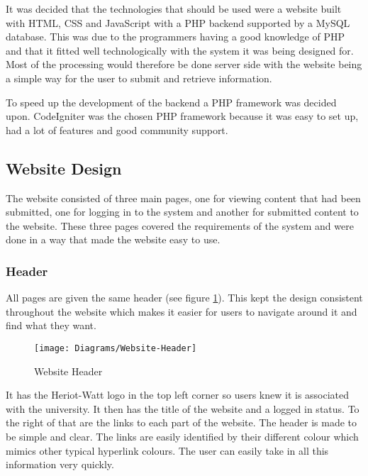 It was decided that the technologies that should be used were a website built with HTML, CSS and JavaScript with a PHP backend supported by a MySQL database. This was due to the programmers having a good knowledge of PHP and that it fitted well technologically with the system it was being designed for. Most of the processing would therefore be done server side with the website being a simple way for the user to submit and retrieve information.

To speed up the development of the backend a PHP framework was decided upon. CodeIgniter was the chosen PHP framework because it was easy to set up, had a lot of features and good community support.

\subsection{Website Design}
The website consisted of three main pages, one for viewing content that had been submitted, one for logging in to the system and another for submitted content to the website. These three pages covered the requirements of the system and were done in a way that made the website easy to use. 

\subsubsection{Header}
All pages are given the same header (see figure \ref{Website-Header}). This kept the design consistent throughout the website which makes it easier for users to navigate around it and find what they want.

\begin{figure}
\begin{centering}
\texttt{[image: Diagrams/Website-Header]}
\par\end{centering}

\caption{Website Header}
\label{Website-Header}
\end{figure}

It has the Heriot-Watt logo in the top left corner so users knew it is associated with the university. It then has the title of the website and a logged in status. To the right of that are the links to each part of the website. The header is made to be simple and clear. The links are easily identified by their different colour which mimics other typical hyperlink colours. The user can easily take in all this information very quickly.


